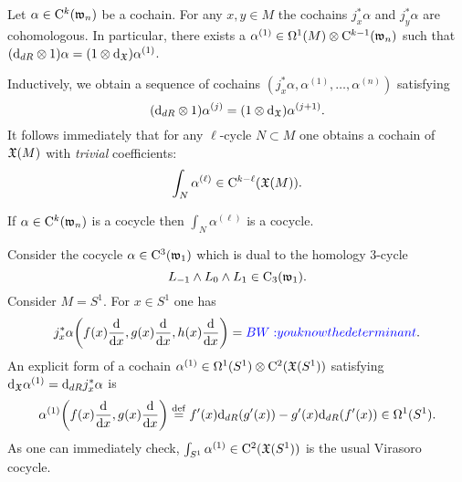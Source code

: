 \documentclass[11pt]{amsart}
\numberwithin{equation}{section}
\def\brian{\textcolor{blue}{BW: }\textcolor{blue}}
\def\define{\overset{\rm def}{=}}
\begin{document}
\begin{lem}
Let $\alpha \in {\rm C}^k(\mathfrak w_n)$ be a cochain. 
For any $x,y \in M$ the cochains $j_x^* \alpha$ and $j_y^* \alpha$ are cohomologous. 
In particular, there exists a $\alpha^{(1)} \in \Omega^1(M) \otimes {\rm C}^{k-1}(\mathfrak w_n)$ such that $({\rm d}_{dR} \otimes 1) \alpha = (1 \otimes {\rm d}_{\mathfrak X}) \alpha^{(1)}$. 
\end{lem}

Inductively, we obtain a sequence of cochains $(j_x^* \alpha, \alpha^{(1)}, \ldots, \alpha^{(n)})$ satisfying 
\[
({\rm d}_{dR} \otimes 1) \alpha^{(j)} = (1 \otimes {\rm d}_{\mathfrak X}) \alpha^{(j+1)} .
\]
It follows immediately that for any $\ell$-cycle $N \subset M$ one obtains a cochain of $\mathfrak X(M)$ with {\em trivial} coefficients:
\[
\int_N \alpha^{(\ell)} \in {\rm C}^{k-\ell}(\mathfrak X(M)) .
\]

\begin{lem}
If $\alpha \in {\rm C}^k(\mathfrak w_n)$ is a cocycle then $\int_N \alpha^{(\ell)}$ is a cocycle. 
\end{lem}

\begin{eg}
Consider the cocycle $\alpha \in {\rm C}^3(\mathfrak w_1)$ which is dual to the homology $3$-cycle
\[
L_{-1} \wedge L_0 \wedge L_1 \in {\rm C}_3(\mathfrak w_1) .
\]
Consider $M = S^1$. 
For $x \in S^1$ one has 
\[
j_x^* \alpha \bigg(f(x) \frac{\d}{\d x} , g(x) \frac{\d}{\d x} , h(x) \frac{\d}{\d x} \bigg) = \brian{you know the determinant} .
\]
An explicit form of a cochain $\alpha^{(1)} \in \Omega^1(S^1) \otimes {\rm C}^2(\mathfrak X(S^1))$ satisfying ${\rm d}_{\mathfrak X} \alpha^{(1)} = {\rm d}_{dR} j_x^* \alpha$ is
\[
\alpha^{(1)} \bigg( f(x) \frac{\d}{\d x} , g(x) \frac{\d}{\d x} \bigg) \define f'(x) \d_{dR} (g'(x)) - g'(x) \d_{dR} (f'(x)) \in \Omega^1(S^1) .
\]
As one can immediately check, $\int_{S^1} \alpha^{(1)} \in {\rm C}^2 (\mathfrak X(S^1))$ is the usual Virasoro cocycle.
\end{eg}
\end{document}
